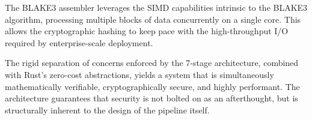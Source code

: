 The BLAKE3 assembler leverages the SIMD capabilities intrinsic to the BLAKE3 algorithm, processing multiple blocks of data concurrently on a single core. This allows the cryptographic hashing to keep pace with the high-throughput I/O required by enterprise-scale deployment.

The rigid separation of concerns enforced by the 7-stage architecture, combined with Rust's zero-cost abstractions, yields a system that is simultaneously mathematically verifiable, cryptographically secure, and highly performant. The architecture guarantees that security is not bolted on as an afterthought, but is structurally inherent to the design of the pipeline itself.

